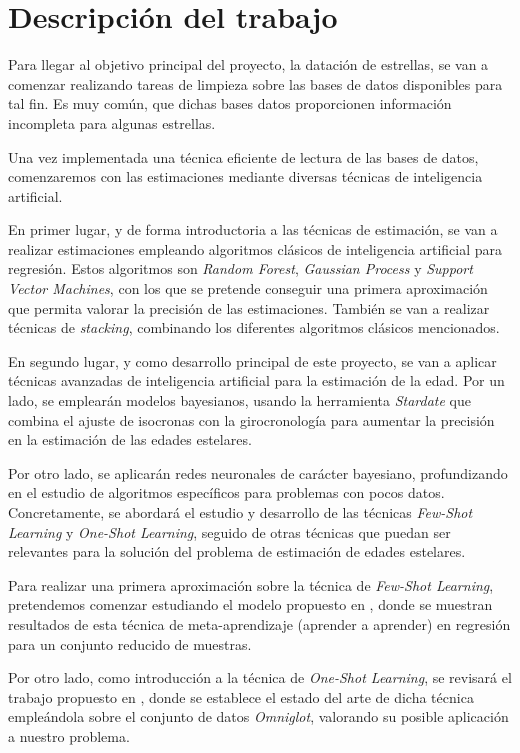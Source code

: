 \documentclass[12pt,oneside,a4paper]{article}
\begin{document}
\section{Descripción del trabajo}

Para llegar al objetivo principal del proyecto, la datación de estrellas, se van a comenzar realizando tareas de limpieza sobre las bases de datos disponibles para tal fin. Es muy común, que dichas bases datos proporcionen información incompleta para algunas estrellas.

Una vez implementada una técnica eficiente de lectura de las bases de datos, comenzaremos con las estimaciones mediante diversas técnicas de inteligencia artificial.

En primer lugar, y de forma introductoria a las técnicas de estimación, se van a realizar estimaciones empleando algoritmos clásicos de inteligencia artificial para regresión. Estos algoritmos son \textit{Random Forest}, \textit{Gaussian Process} y \textit{Support Vector Machines}, con los que se pretende conseguir una primera aproximación que permita valorar la precisión de las estimaciones. También se van a realizar técnicas de \textit{stacking}, combinando los diferentes algoritmos clásicos mencionados.

En segundo lugar, y como desarrollo principal de este proyecto, se van a aplicar técnicas avanzadas de inteligencia artificial para la estimación de la edad. Por un lado, se emplearán modelos bayesianos, usando la herramienta \textit{Stardate} \cite{Angus2019} que combina el ajuste de isocronas con la girocronología para aumentar la precisión en la estimación de las edades estelares. 

Por otro lado, se aplicarán redes neuronales de carácter bayesiano, profundizando en el estudio de algoritmos específicos para problemas con pocos datos. Concretamente, se abordará el estudio y desarrollo de las técnicas \textit{Few-Shot Learning} y \textit{One-Shot Learning}, seguido de otras técnicas que puedan ser relevantes para la solución del problema de estimación de edades estelares.

Para realizar una primera aproximación sobre la técnica de \textit{Few-Shot Learning}, pretendemos comenzar estudiando el modelo propuesto en \cite{Chelsea2017}, donde se muestran resultados de esta técnica de meta-aprendizaje (aprender a aprender) en regresión para un conjunto reducido de muestras.

Por otro lado, como introducción a la técnica de \textit{One-Shot Learning}, se revisará el trabajo propuesto en \cite{Kaiser2017}, donde se establece el estado del arte de dicha técnica empleándola sobre el conjunto de datos \textit{Omniglot}, valorando su posible aplicación a nuestro problema.
\end{document}
